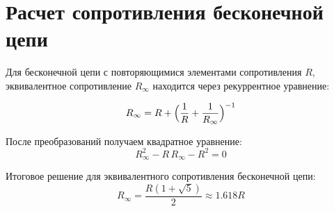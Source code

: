 \documentclass[12pt]{article}
\begin{document}
\section*{Расчет сопротивления бесконечной цепи}

Для бесконечной цепи с повторяющимися элементами сопротивления $R$, эквивалентное сопротивление $R_{\infty}$ находится через рекуррентное уравнение:

\[
R_{\infty} = R + \Bigl(\frac{1}{R} + \frac{1}{R_{\infty}}\Bigr)^{-1}
\]

После преобразований получаем квадратное уравнение:
\[
R_\infty^2 - R\,R_\infty - R^2 = 0
\]

Итоговое решение для эквивалентного сопротивления бесконечной цепи:
\[
R_\infty = \frac{R(1 + \sqrt{5})}{2} \approx 1.618R
\]
\end{document}
